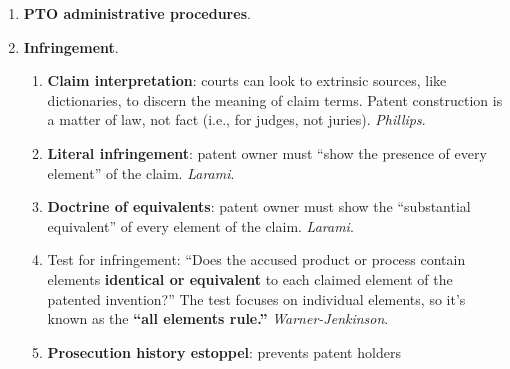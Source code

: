 \begin{enumerate}
\begin{enumerate}
\begin{enumerate}
{            Elizabeth}.
        \end{enumerate}
        \item \textbf{Nonobviousness} (35 U.S.C. \S\ 103).
        \begin{enumerate}
            \item ``Primary gatekeeper of the patent system.''
            \item No patent if the differences from prior art would have been 
            obvious to a PHOSITA.
            \item \S\ 103 requires an ``inventive leap.'' Minor obvious 
            improvements don't qualify. \emph{Graham}.
            \item The Federal Circuit's ``teaching, suggestion, or 
            motivation'' (TSM) test is too restrictive. The standard for 
            nonobviousness is flexible. Courts can use common sense.  
            \emph{KSR}.
            \item AIA: obviousness is determined at the \emph{filing date}, 
            not the invention date.
        \end{enumerate}
    \end{enumerate}
    \item \textbf{PTO administrative procedures}.
    \item \textbf{Infringement}.
    \begin{enumerate}
        \item \textbf{Claim interpretation}: courts can look to extrinsic 
        sources, like dictionaries, to discern the meaning of claim terms.  
        Patent construction is a matter of law, not fact (i.e., for judges, 
        not juries).  \emph{Phillips}.
        \item \textbf{Literal infringement}: patent owner must ``show the 
        presence of every element'' of the claim. \emph{Larami}.
        \item \textbf{Doctrine of equivalents}: patent owner must show the 
        ``substantial equivalent'' of every element of the claim.  
        \emph{Larami}.
        \item Test for infringement: ``Does the accused product or process 
        contain elements \textbf{identical or equivalent} to each claimed 
        element of the patented invention?'' The test focuses on individual 
        elements, so it's known as the \textbf{``all elements rule.''} 
        \emph{Warner-Jenkinson}.
        \item \textbf{Prosecution history estoppel}: prevents patent holders 

\end{enumerate}
\end{enumerate}
